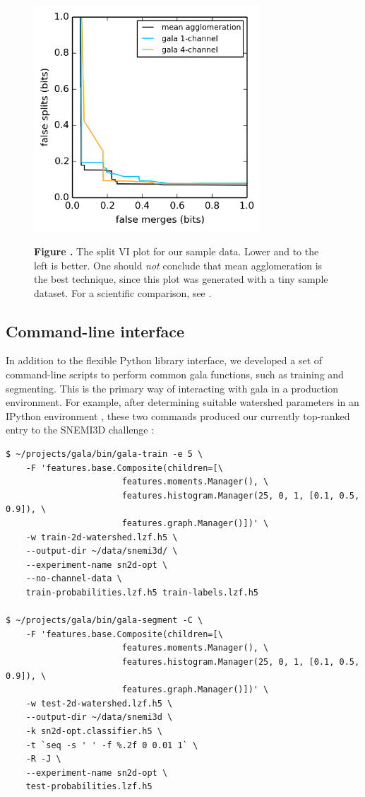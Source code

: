 \documentclass{frontiersSCNS} %
\begin{document}
\begin{figure}
\begin{center}
\includegraphics[width=85mm]{figure2}
\end{center}
 \textbf{\label{fig:02} Figure .}{ The split VI plot for our sample data. Lower and to the left is better. One should \emph{not} conclude that mean agglomeration is the best technique, since this plot was generated with a tiny sample dataset. For a scientific comparison, see \cite{NunezIglesias:2013cd}. }
\end{figure}

\subsection{Command-line interface}

In addition to the flexible Python library interface, we developed a set of command-line scripts to perform common gala functions, such as training and segmenting.
This is the primary way of interacting with gala in a production environment.
For example, after determining suitable watershed parameters in an IPython environment \citep{Perez:2007}, these two commands produced our currently top-ranked entry to the SNEMI3D challenge \citep{snemi}:

{\small
\begin{verbatim}
$ ~/projects/gala/bin/gala-train -e 5 \
    -F 'features.base.Composite(children=[\
                       features.moments.Manager(), \
                       features.histogram.Manager(25, 0, 1, [0.1, 0.5, 0.9]), \
                       features.graph.Manager()])' \
    -w train-2d-watershed.lzf.h5 \
    --output-dir ~/data/snemi3d/ \
    --experiment-name sn2d-opt \
    --no-channel-data \
    train-probabilities.lzf.h5 train-labels.lzf.h5 

$ ~/projects/gala/bin/gala-segment -C \
    -F 'features.base.Composite(children=[\
                       features.moments.Manager(), \
                       features.histogram.Manager(25, 0, 1, [0.1, 0.5, 0.9]), \
                       features.graph.Manager()])' \
    -w test-2d-watershed.lzf.h5 \
    --output-dir ~/data/snemi3d \
    -k sn2d-opt.classifier.h5 \
    -t `seq -s ' ' -f %.2f 0 0.01 1` \
    -R -J \
    --experiment-name sn2d-opt \
    test-probabilities.lzf.h5
\end{verbatim}
}
\end{document}
